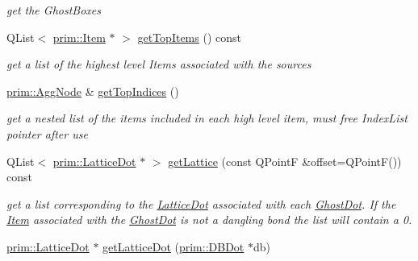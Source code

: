 \begin{DoxyCompactItemize}
\begin{DoxyCompactList}\small\item\em get the Ghost\+Boxes \end{DoxyCompactList}\item 
Q\+List$<$ \hyperlink{classprim_1_1Item}{prim\+::\+Item} $\ast$ $>$ \hyperlink{classprim_1_1Ghost_a920aa6435950563ae70262dcd69df7d4}{get\+Top\+Items} () const \hypertarget{classprim_1_1Ghost_a920aa6435950563ae70262dcd69df7d4}{}\label{classprim_1_1Ghost_a920aa6435950563ae70262dcd69df7d4}

\begin{DoxyCompactList}\small\item\em get a list of the highest level Items associated with the sources \end{DoxyCompactList}\item 
\hyperlink{structprim_1_1AggNode}{prim\+::\+Agg\+Node} \& \hyperlink{classprim_1_1Ghost_af75764943e4245ef8c4825bdbfadec7e}{get\+Top\+Indices} ()\hypertarget{classprim_1_1Ghost_af75764943e4245ef8c4825bdbfadec7e}{}\label{classprim_1_1Ghost_af75764943e4245ef8c4825bdbfadec7e}

\begin{DoxyCompactList}\small\item\em get a nested list of the items included in each high level item, must free Index\+List pointer after use \end{DoxyCompactList}\item 
Q\+List$<$ \hyperlink{classprim_1_1LatticeDot}{prim\+::\+Lattice\+Dot} $\ast$ $>$ \hyperlink{classprim_1_1Ghost_a641a82fd79a022ade58f9a3f392647e2}{get\+Lattice} (const Q\+PointF \&offset=Q\+PointF()) const \hypertarget{classprim_1_1Ghost_a641a82fd79a022ade58f9a3f392647e2}{}\label{classprim_1_1Ghost_a641a82fd79a022ade58f9a3f392647e2}

\begin{DoxyCompactList}\small\item\em get a list corresponding to the \hyperlink{classprim_1_1LatticeDot}{Lattice\+Dot} associated with each \hyperlink{classprim_1_1GhostDot}{Ghost\+Dot}. If the \hyperlink{classprim_1_1Item}{Item} associated with the \hyperlink{classprim_1_1GhostDot}{Ghost\+Dot} is not a dangling bond the list will contain a 0. \end{DoxyCompactList}\item 
\hyperlink{classprim_1_1LatticeDot}{prim\+::\+Lattice\+Dot} $\ast$ \hyperlink{classprim_1_1Ghost_a3d5a8778efd339414b0d37faba25c1dd}{get\+Lattice\+Dot} (\hyperlink{classprim_1_1DBDot}{prim\+::\+D\+B\+Dot} $\ast$db)\hypertarget{classprim_1_1Ghost_a3d5a8778efd339414b0d37faba25c1dd}{}\label{classprim_1_1Ghost_a3d5a8778efd339414b0d37faba25c1dd}


\end{DoxyCompactItemize}
